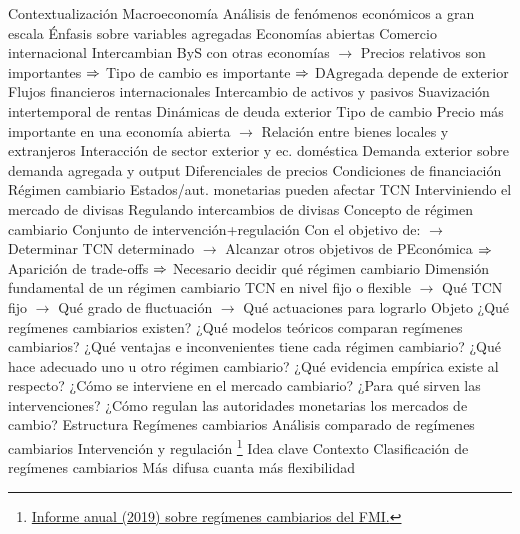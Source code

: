 \documentclass{nuevotema}
\begin{document}
\begin{esquemal}
	\1[] 
		\2 Contextualización
			\3 Macroeconomía
				\4 Análisis de fenómenos económicos a gran escala
				\4 Énfasis sobre variables agregadas
			\3 Economías abiertas
				\4 Comercio internacional
				\4[] Intercambian ByS con otras economías
				\4[] $\to$ Precios relativos son importantes
				\4[] $\Rightarrow$ Tipo de cambio es importante
				\4[] $\Rightarrow$ DAgregada depende de exterior
				\4 Flujos financieros internacionales
				\4[] Intercambio de activos y pasivos
				\4[] Suavización intertemporal de rentas
				\4[] Dinámicas de deuda exterior
				\4 Tipo de cambio
				\4[] Precio más importante en una economía abierta
				\4[] $\to$ Relación entre bienes locales y extranjeros
				\4 Interacción de sector exterior y ec. doméstica
				\4[] Demanda exterior sobre demanda agregada y output
				\4[] Diferenciales de precios
				\4[] Condiciones de financiación
			\3 Régimen cambiario
				\4 Estados/aut. monetarias pueden afectar TCN
				\4[] Interviniendo el mercado de divisas
				\4[] Regulando intercambios de divisas
				\4 Concepto de régimen cambiario
				\4[] Conjunto de intervención+regulación
				\4[] Con el objetivo de:
				\4[] $\to$ Determinar TCN determinado
				\4[] $\to$ Alcanzar otros objetivos de PEconómica
				\4[] $\Rightarrow$ Aparición de trade-offs
				\4[] $\Rightarrow$ Necesario decidir qué régimen cambiario
				\4 Dimensión fundamental de un régimen cambiario
				\4[] TCN en nivel fijo o flexible
				\4[] $\to$ Qué TCN fijo
				\4[] $\to$ Qué grado de fluctuación
				\4[] $\to$ Qué actuaciones para lograrlo
		\2 Objeto
			\3 ¿Qué regímenes cambiarios existen?
			\3 ¿Qué modelos teóricos comparan regímenes cambiarios?
			\3 ¿Qué ventajas e inconvenientes tiene cada régimen cambiario?
			\3 ¿Qué hace adecuado uno u otro régimen cambiario?
			\3 ¿Qué evidencia empírica existe al respecto?
			\3 ¿Cómo se interviene en el mercado cambiario?
			\3 ¿Para qué sirven las intervenciones?
			\3 ¿Cómo regulan las autoridades monetarias los mercados de cambio?
		\2 Estructura
			\3 Regímenes cambiarios
			\3 Análisis comparado de regímenes cambiarios
			\3 Intervención y regulación
	\1 \footnote{\href{https://www.imf.org/en/Publications/Annual-Report-on-Exchange-Arrangements-and-Exchange-Restrictions/Issues/2019/04/24/Annual-Report-on-Exchange-Arrangements-and-Exchange-Restrictions-2018-46162}{Informe anual (2019) sobre regímenes cambiarios del FMI.}}
		\2 Idea clave
			\3 Contexto
				\4 Clasificación de regímenes cambiarios
				\4[] Más difusa cuanta más flexibilidad

\end{esquemal}
\end{document}
